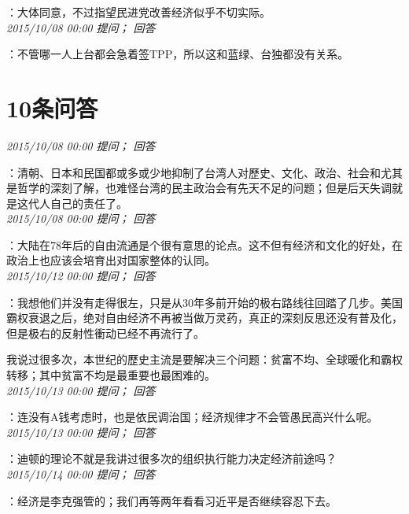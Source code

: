 \documentclass[twocolumn]{ctexart}
\begin{document}
：大体同意，不过指望民进党改善经济似乎不切实际。\\

\textit{\hfill\noindent\small 2015/10/08 00:00 提问； 回答}

：不管哪一人上台都会急着签TPP，所以这和蓝绿、台独都没有关系。\\

\section{10条问答}

\textit{\hfill\noindent\small 2015/10/08 00:00 提问； 回答}

：清朝、日本和民国都或多或少地抑制了台湾人对歷史、文化、政治、社会和尤其是哲学的深刻了解，也难怪台湾的民主政治会有先天不足的问题；但是后天失调就是这代人自己的责任了。\\

\textit{\hfill\noindent\small 2015/10/08 00:00 提问； 回答}

：大陆在78年后的自由流通是个很有意思的论点。这不但有经济和文化的好处，在政治上也应该会培育出对国家整体的认同。\\

\textit{\hfill\noindent\small 2015/10/12 00:00 提问； 回答}

：我想他们并没有走得很左，只是从30年多前开始的极右路线往回踏了几步。美国霸权衰退之后，绝对自由经济不再被当做万灵药，真正的深刻反思还没有普及化，但是极右的反射性衝动已经不再流行了。

我说过很多次，本世纪的歷史主流是要解决三个问题：贫富不均、全球暖化和霸权转移；其中贫富不均是最重要也最困难的。\\

\textit{\hfill\noindent\small 2015/10/13 00:00 提问； 回答}

：连没有A钱考虑时，也是依民调治国；经济规律才不会管愚民高兴什么呢。\\

\textit{\hfill\noindent\small 2015/10/13 00:00 提问； 回答}

：迪顿的理论不就是我讲过很多次的组织执行能力决定经济前途吗？\\

\textit{\hfill\noindent\small 2015/10/14 00:00 提问； 回答}

：经济是李克强管的；我们再等两年看看习近平是否继续容忍下去。\\
\end{document}
